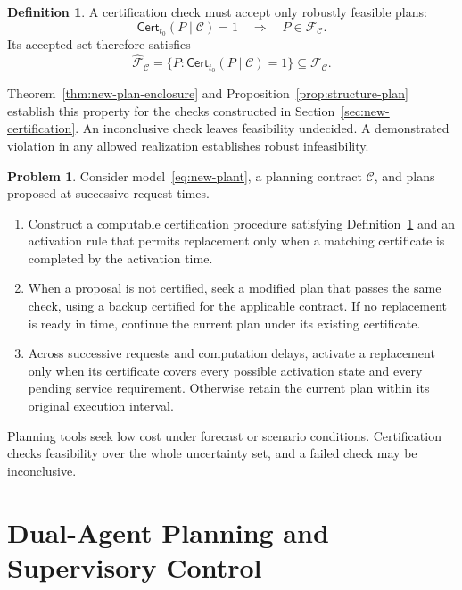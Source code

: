 \documentclass[preprint,12pt]{elsarticle}
\theoremstyle{definition}
\theoremstyle{plain}
\theoremstyle{definition}
\newtheorem{definition}{Definition}
\newtheorem{problem}{Problem}
\theoremstyle{plain}
\begin{document}
\begin{definition}
\label{def:feasibility-certificate}
A certification check must accept only robustly feasible plans:
\[
\mathsf{Cert}_{t_0}(P\mid\mathcal C)=1
\quad\Longrightarrow\quad P\in\mathcal F_{\mathcal C}.
\]
Its accepted set therefore satisfies
\begin{equation}
\widehat{\mathcal F}_{\mathcal C}
=\{P:\mathsf{Cert}_{t_0}(P\mid\mathcal C)=1\}
\subseteq\mathcal F_{\mathcal C}.
\label{eq:benchmark-certifiable-set}
\end{equation}
\end{definition}
Theorem~\ref{thm:new-plan-enclosure} and
Proposition~\ref{prop:structure-plan} establish this property for the
checks constructed in Section~\ref{sec:new-certification}. An
inconclusive check leaves feasibility undecided. A demonstrated
violation in any allowed realization establishes robust infeasibility.

\begin{problem}
\label{prob:supervised-planning}
Consider model~\eqref{eq:new-plant}, a planning contract $\mathcal C$,
and plans proposed at successive request times.
\begin{enumerate}
\item Construct a computable certification procedure satisfying
Definition~\ref{def:feasibility-certificate} and an activation rule that
permits replacement only when a matching certificate is completed by
the activation time.
\item When a proposal is not certified, seek a modified plan that passes
the same check, using a backup certified for the applicable contract.
If no replacement is ready in time, continue the current plan under
its existing certificate.
\item Across successive requests and computation delays, activate a
replacement only when its certificate covers every possible activation
state and every pending service requirement. Otherwise retain
the current plan within its original execution interval.
\end{enumerate}
\end{problem}
Planning tools seek low cost under forecast or scenario conditions.
Certification checks feasibility over the whole uncertainty set, and a
failed check may be inconclusive.

\section{Dual-Agent Planning and Supervisory Control}
\label{sec:new-agent}
\end{document}
